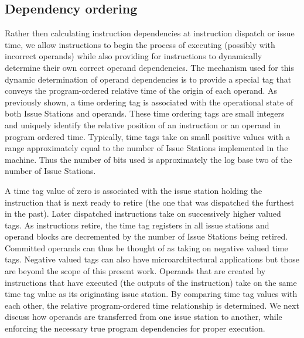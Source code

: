 \documentclass[10pt,dvips]{article}
\begin{document}
\subsection{Dependency ordering}
%
Rather then calculating instruction dependencies at instruction
dispatch or issue time, we allow instructions to begin
the process of executing (possibly with incorrect operands)
while also providing for instructions to
dynamically determine their own correct
operand dependencies.
The mechanism used for this dynamic determination of
operand dependencies is to provide a special tag that
conveys the program-ordered relative time of the origin of
each operand.
As previously shown,
a time ordering tag is associated
with the operational state of both Issue Stations and operands.
These time ordering tags are small
integers and uniquely identify the relative position of an instruction
or an operand in program ordered time.
Typically, time tags take on small positive values with
a range approximately equal to the 
number of Issue Stations implemented in
the machine.  Thus the number of bits used is approximately
the log base two of the number of Issue Stations.

A time tag value of zero is associated with the
issue station holding the instruction that is next ready
to retire (the one that was dispatched the furthest in the past).
Later dispatched instructions take on successively higher
valued tags.
As instructions retire, the time tag registers in all
issue stations and operand blocks are decremented by the
number of Issue Stations being retired.
Committed operands can thus be thought of as taking on
negative valued time tags.  Negative valued tags can also have
microarchitectural applications but those are beyond the
scope of this present work.
Operands that are created by instructions that have executed
(the outputs of the instruction) take on
the same time tag value as its originating issue station.  
By comparing time tag values with each other, the relative
program-ordered time relationship is determined.
We next discuss
how operands are transferred from one
issue station to another, while enforcing the necessary
true program dependencies for proper execution.
%
%
\end{document}
